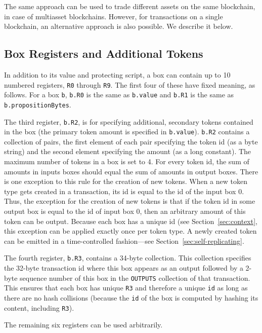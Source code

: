 \documentclass[11pt]{article}
\newcommand{\authnote}[2]{\marginpar{\parbox{\marginparwidth}{\tiny %
  \textsf{#1 {\textcolor{blue}{notes: #2}}}}}%
  \textcolor{blue}{\textbf{\dag}}}
\newcommand{\authnote}[2]{
  \textsf{#1 \textcolor{blue}{: #2}}}
\newcommand{\authnote}[2]{}
\newcommand{\lnote}[1]{{\authnote{\textcolor{orange}{Leo notes}}{#1}}}
\begin{document}
The same approach can be used to trade different assets on the same blockchain, in case of multiasset blockchains. However, for transactions on a single blockchain, an alternative approach is also possible. We describe it below.

\subsection{Box Registers and Additional Tokens}
\label{sec:box-registers}
In addition to its value and protecting script, a box can contain up to 10 numbered registers, \texttt{R0} through \texttt{R9}. The first four of these have fixed meaning, as follows. For a box \texttt{b}, \texttt{b.R0} is the same as \texttt{b.value} and \texttt{b.R1} is the same as \texttt{b.propositionBytes}. 


The third register, \texttt{b.R2}, is for specifying additional, secondary tokens contained in the box (the primary token amount is specified in \texttt{b.value}). \texttt{b.R2} contains a collection of pairs, the first element of each pair specifying the token id (as a byte string) and the second element specifying the amount (as a long constant). The maximum number of tokens in a box is set to 4. For every token id, the sum of amounts in inputs boxes should equal the sum of amounts in output boxes. There is one exception to this rule for the creation of new tokens. When a new token type gets created in a transaction, its id is equal to the id of the input box 0. Thus, the exception for the creation of new tokens is that if the token id in some output box is equal to the id of input box 0, then an arbitrary amount of this token can be output. Because each box has a unique id (see Section~\ref{sec:context}, this exception can be applied exactly once per token type. A newly created token can be emitted in a time-controlled fashion---see Section~\ref{sec:self-replicating}.



The fourth register, \texttt{b.R3}, contains a 34-byte collection. This collection specifies the 32-byte transaction id \lnote{how is transaction id computed?} where this box appears as an output followed by a 2-byte sequence number of this box in the \texttt{OUTPUTS} collection of that transaction. This ensures that each box has unique \texttt{R3} and therefore a unique \texttt{id} as long as there are no hash collisions (because the \texttt{id} of the box is computed by hashing its content, including \texttt{R3}).

The remaining six registers can be used arbitrarily. 
\end{document}
